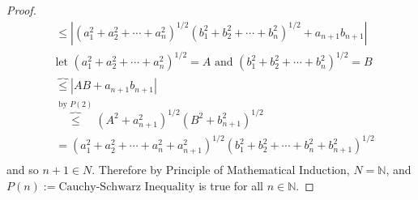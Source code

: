 \documentclass[11pt,twoside, reqno, align]{amsart}
\theoremstyle{remark}
\def\N{\mathbb N}
\begin{document}
\begin{proof}
\begin{align*}
    & \leq |(a_1^2+a_2^2+\cdots+a_n^2)^{1/2}(b_1^2+b_2^2+\cdots+b_n^2)^{1/2} + a_{n+1}b_{n+1}| \\
    & \text{let $(a_1^2+a_2^2+\cdots+a_n^2)^{1/2} = A$ and $(b_1^2+b_2^2+\cdots+b_n^2)^{1/2} = B$} \\
    & \overbrace{\leq} |AB + a_{n+1}b_{n+1}| \\
    & \overbrace{\leq}^\text{by $P(2)$} (A^2 + a_{n+1}^2)^{1/2}(B^2 + b_{n+1}^2)^{1/2} \\
    & = (a_1^2+a_2^2+\cdots+a_n^2 + a_{n+1}^2)^{1/2}(b_1^2+b_2^2+\cdots+b_n^2 + b_{n+1}^2)^{1/2} \\
\end{align*}
and so $n+1 \in N$. Therefore by Principle of Mathematical Induction, $N = \N$, and $P(n):= \text{Cauchy-Schwarz Inequality}$ is true for all $n \in \N$.
\end{proof}
\end{document}
